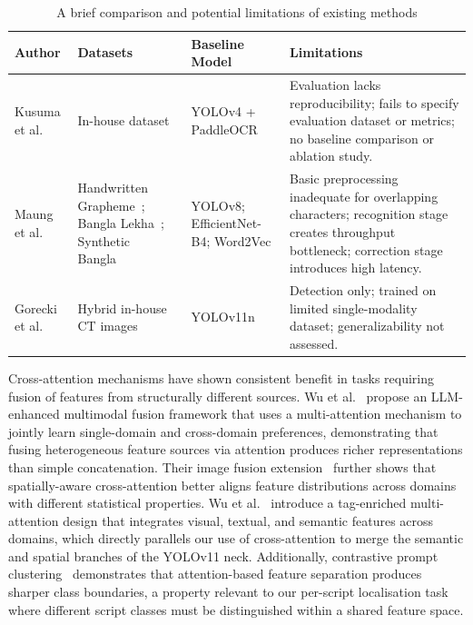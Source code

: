 \documentclass{ieeeaccess}
\begin{document}
\begin{table}[htbp]
\caption{A brief comparison and potential limitations of existing methods}
\label{tab:related}
\renewcommand{\arraystretch}{1.1}
\begin{center}
\scriptsize
\begin{tabular}{>{\raggedright\arraybackslash}p{1.2cm}
                >{\raggedright\arraybackslash}p{1.5cm}
                >{\raggedright\arraybackslash}p{1.3cm}
                >{\raggedright\arraybackslash}p{3.0cm}}
\hline
\textbf{Author} & \textbf{Datasets} & \textbf{Baseline Model} & \textbf{Limitations} \\
\hline
Kusuma et al.~\cite{b23} & In-house dataset & YOLOv4 + PaddleOCR &
  Evaluation lacks reproducibility; fails to specify evaluation dataset or metrics; no baseline comparison or ablation study. \\
\hline
Maung et al.~\cite{b24} & Handwritten Grapheme~\cite{b25}; Bangla Lekha~\cite{b26}; Synthetic Bangla~\cite{b27} &
  YOLOv8; EfficientNet-B4; Word2Vec &
  Basic preprocessing inadequate for overlapping characters; recognition stage creates throughput bottleneck; correction stage introduces high latency. \\
\hline
Gorecki et al.~\cite{b28} & Hybrid in-house CT images & YOLOv11n &
  Detection only; trained on limited single-modality dataset; generalizability not assessed. \\
\hline
\end{tabular}
\end{center}
\end{table}

Cross-attention mechanisms have shown consistent benefit in tasks requiring fusion of features from structurally different sources. Wu et al.~\cite{b29} propose an LLM-enhanced multimodal fusion framework that uses a multi-attention mechanism to jointly learn single-domain and cross-domain preferences, demonstrating that fusing heterogeneous feature sources via attention produces richer representations than simple concatenation. Their image fusion extension~\cite{b31} further shows that spatially-aware cross-attention better aligns feature distributions across domains with different statistical properties. Wu et al.~\cite{b32} introduce a tag-enriched multi-attention design that integrates visual, textual, and semantic features across domains, which directly parallels our use of cross-attention to merge the semantic and spatial branches of the YOLOv11 neck. Additionally, contrastive prompt clustering~\cite{b30} demonstrates that attention-based feature separation produces sharper class boundaries, a property relevant to our per-script localisation task where different script classes must be distinguished within a shared feature space.
\end{document}

